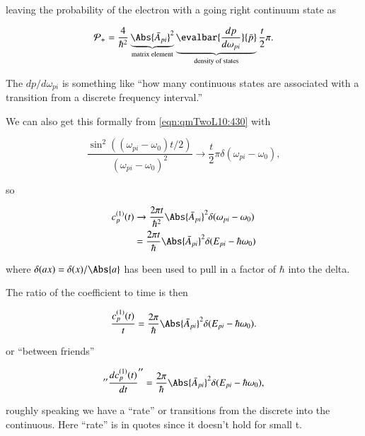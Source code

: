 leaving the probability of the electron with a going right continuum state as

\begin{equation}\label{eqn:qmTwoL10:470}
\mathcal{P}_{+} 
=
\frac{4}{\hbar^2}
\underbrace{
\Abs{
\bar{A}_{pi}
}^2 
}_{\text{matrix element}}
\underbrace{\evalbar{\frac{dp}{d\omega_{pi}}}{\bar{p}}}_{\text{density of states}}
\frac{t}{2} \pi.
\end{equation}

The $dp/d\omega_{pi}$ is something like ``how many continuous states are associated with a transition from a discrete frequency interval.''

We can also get this formally from \ref{eqn:qmTwoL10:430} with

\begin{equation}\label{eqn:qmTwoL10:490}
\frac{
\sin^2\left( (\omega_{pi} - \omega_0) t/2 \right)
}{
\left( \omega_{pi} - \omega_0 \right)^2
}
\rightarrow 
\frac{t}{2} \pi \delta(\omega_{pi} - \omega_0),
\end{equation}

so

\begin{equation}\label{eqn:qmTwoL10:510}
\begin{aligned}
c_p^{(1)}(t) 
&\rightarrow \frac{2 \pi t}{\hbar^2} 
\Abs{
\bar{A}_{pi}
}^2 
\delta(\omega_{pi} - \omega_0) \\
&=
\frac{2 \pi t}{\hbar} 
\Abs{
\bar{A}_{pi}
}^2 
\delta(E_{pi} - \hbar \omega_0)
\end{aligned}
\end{equation}

where $\delta(ax) = \delta(x)/\Abs{a}$ has been used to pull in a factor of $\hbar$ into the delta.

The ratio of the coefficient to time is then

\begin{equation}\label{eqn:qmTwoL10:530}
\frac{c_p^{(1)}(t) }{t}
=
\frac{2 \pi}{\hbar} 
\Abs{
\bar{A}_{pi}
}^2 
\delta(E_{pi} - \hbar \omega_0).
\end{equation}

or ``between friends''

\begin{equation}\label{eqn:qmTwoL10:550}
''\frac{dc_p^{(1)}(t) }{dt}''
=
\frac{2 \pi}{\hbar} 
\Abs{
\bar{A}_{pi}
}^2 
\delta(E_{pi} - \hbar \omega_0),
\end{equation}

roughly speaking we have a ``rate'' or transitions from the discrete into the continuous.  Here ``rate'' is in quotes since it doesn't hold for small t.

